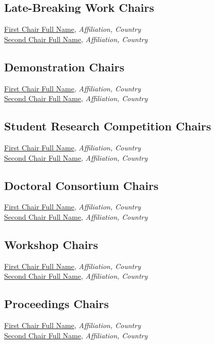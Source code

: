 \subsection{Late-Breaking Work Chairs}
\href{https://orcid.org/0000-0001-2345-6789}{First Chair Full Name}, \emph{Affiliation, Country}\\
\href{https://orcid.org/0000-0001-2345-6789}{Second Chair Full Name}, \emph{Affiliation, Country}\\

\subsection{Demonstration Chairs}
\href{https://orcid.org/0000-0001-2345-6789}{First Chair Full Name}, \emph{Affiliation, Country}\\
\href{https://orcid.org/0000-0001-2345-6789}{Second Chair Full Name}, \emph{Affiliation, Country}\\

\subsection{Student Research Competition Chairs}
\href{https://orcid.org/0000-0001-2345-6789}{First Chair Full Name}, \emph{Affiliation, Country}\\
\href{https://orcid.org/0000-0001-2345-6789}{Second Chair Full Name}, \emph{Affiliation, Country}\\

\subsection{Doctoral Consortium Chairs}
\href{https://orcid.org/0000-0001-2345-6789}{First Chair Full Name}, \emph{Affiliation, Country}\\
\href{https://orcid.org/0000-0001-2345-6789}{Second Chair Full Name}, \emph{Affiliation, Country}\\

\subsection{Workshop Chairs}
\href{https://orcid.org/0000-0001-2345-6789}{First Chair Full Name}, \emph{Affiliation, Country}\\
\href{https://orcid.org/0000-0001-2345-6789}{Second Chair Full Name}, \emph{Affiliation, Country}\\

\subsection{Proceedings Chairs}
\href{https://orcid.org/0000-0001-2345-6789}{First Chair Full Name}, \emph{Affiliation, Country}\\
\href{https://orcid.org/0000-0001-2345-6789}{Second Chair Full Name}, \emph{Affiliation, Country}\\

